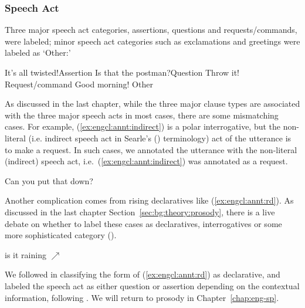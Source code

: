 \subsubsection{Speech Act}

Three major speech act categories, assertions, questions and requests/commands, were labeled;
minor speech act categories such as exclamations and greetings were labeled as `Other:' 

\bxl\label{ex:engcl:annt:sp:a} It’s all twisted!\hfill	Assertion
\ex\label{ex:engcl:annt:sp:q} Is that the postman?\hfill		Question
\ex\label{ex:engcl:annt:sp:r} Throw it!	\hfill		Request/command
\ex \label{ex:engcl:annt:sp:o} Good morning! \hfill Other
\exl
\eex

As discussed in the last chapter, while the three major clause types are associated with the three major speech acts in most cases, there are some mismatching cases. For example, (\ref{ex:engcl:annt:indirect}) is a polar interrogative, but the non-literal (i.e. indirect speech act in Searle's (\cite*{searle1975indirect}) terminology) act of the utterance is to make a request.
In such cases, we annotated the utterance with the non-literal (indirect) speech act, i.e.\ (\ref{ex:engcl:annt:indirect}) was annotated as a request.

Can you put that down?
\eex 

Another complication comes from rising declaratives like (\ref{ex:engcl:annt:rd}). As discussed in the last chapter Section~\ref{sec:bg:theory:prosody}, there is a live debate on whether to label these cases as declaratives, interrogatives or some more sophisticated category (\cite{gunlogson2008,  farkasroelofsen2017}). 

is it raining $\nearrow$
\eex

We followed \textcite{gunlogson2008} in classifying the form of (\ref{ex:engcl:annt:rd}) as declarative, and labeled the speech act as either question or assertion depending on the contextual information, following \textcite{jeong2018, goodhue2021rd}. We will return to prosody in Chapter~\ref{chap:eng-sp}.


